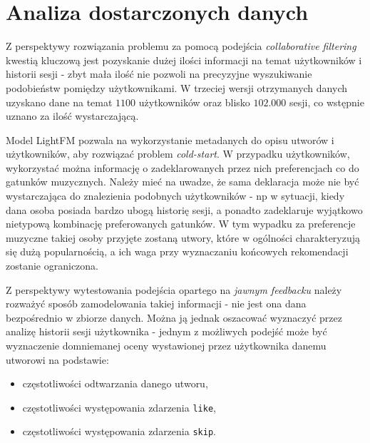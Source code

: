 \documentclass[10pt,a4paper]{article}
\begin{document}
\section{Analiza dostarczonych danych}


Z perspektywy rozwiązania problemu za pomocą podejścia \textit{collaborative filtering} kwestią kluczową jest pozyskanie dużej ilości informacji na temat użytkowników i historii sesji - zbyt mała ilość nie pozwoli na precyzyjne wyszukiwanie podobieństw pomiędzy użytkownikami. W trzeciej wersji otrzymanych danych uzyskano dane na temat $1100$ użytkowników oraz blisko $102.000$ sesji, co wstępnie uznano za ilość wystarczającą.


Model LightFM pozwala na wykorzystanie metadanych do opisu utworów i użytkowników, aby rozwiązać problem \textit{cold-start}. W przypadku użytkowników, wykorzystać można informację o zadeklarowanych przez nich preferencjach co do gatunków muzycznych. Należy mieć na uwadze, że sama deklaracja może nie być wystarczająca do znalezienia podobnych użytkowników - np w sytuacji, kiedy dana osoba posiada bardzo ubogą historię sesji, a ponadto zadeklaruje wyjątkowo nietypową kombinację preferowanych gatunków. W tym wypadku za preferencje muzyczne takiej osoby przyjęte zostaną utwory, które w ogólności charakteryzują się dużą popularnością, a ich waga przy wyznaczaniu końcowych rekomendacji zostanie ograniczona. 

Z perspektywy wytestowania podejścia opartego na \textit{jawnym feedbacku} należy rozważyć sposób zamodelowania takiej informacji - nie jest ona dana bezpośrednio w zbiorze danych. Można ją jednak oszacować wyznaczyć przez analizę historii sesji użytkownika - jednym z możliwych podejść może być wyznaczenie domniemanej oceny wystawionej przez użytkownika danemu utworowi na podstawie:

\begin{itemize}

\item częstotliwości odtwarzania danego utworu,
\item częstotliwości występowania zdarzenia \texttt{like},
\item częstotliwości występowania zdarzenia \texttt{skip}.

\end{itemize}
\end{document}
